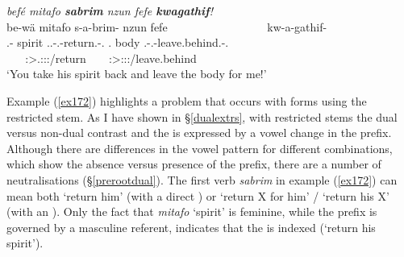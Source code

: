\begin{exe}
	\ex \emph{befé mitafo \textbf{sabrim} nzun fefe \textbf{kwagathif}!}\\
	\glll be-wä mitafo s-a-brim-\Zero{} nzun fefe~~~~~~~~~~~~~~~~~ kw-a-gathif-\Zero{}\\
	\Ssg.\Erg-\Emph{} spirit \Tsg.\Masc.\Bet{}-\Vc.\Ndu-return.\Rs-\Ssg.\Imp{} \Fsg.\Dat{} body \Fsg.\Bet-\Vc.\Ndu-leave.behind.\Rs-\Ssg.\Imp{}\\
	~ ~ {\Ssg:\Sbj>\Tsg.\Masc:\Io:\Imp:\Pfv/return} ~ ~ {\Ssg:\Sbj>\Fsg:\Io:\Imp:\Pfv/leave.behind}\\
	\trans `You take his spirit back and leave the body for me!' 
	\label{ex172}
\end{exe}

Example (\ref{ex172}) highlights a problem that occurs with  forms using the restricted stem. As I have shown in \S{}\ref{dualextrs}, with restricted stems the dual versus non-dual contrast and the  is expressed by a vowel change in the prefix. Although there are differences in the vowel pattern for different  combinations, which show the absence versus presence of the  prefix, there are a number of neutralisations (\S{}\ref{prerootdual}). The first verb \emph{sabrim} in example (\ref{ex172}) can mean both `return him' (with a direct ) or `return X for him' / `return his X' (with an ). Only the fact that \emph{mitafo} `spirit' is feminine, while the prefix is governed by a masculine referent, indicates that the  is indexed (`return his spirit').%

